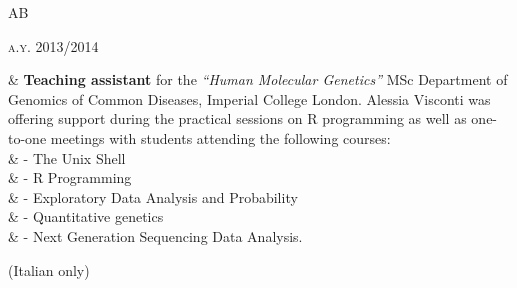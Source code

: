 \documentclass[a4paper,10pt]{article}
\newenvironment{doubletablelist}
{
	\vspace{-0.2cm}
	\begin{longtable}[!h]{AB}}{\end{longtable}
}
\newcommand{\dtlist}[2]{
\hspace{-3cm}
\noindent
	\begin{minipage}{0.22\textwidth}
	\begin{flushright}
	\textsc{#1}
	\end{flushright}
	\end{minipage}
	& #2\\[0.2cm]
}
\begin{document}
\begin{doubletablelist}
	\dtlist{a.y. 2013/2014}{\textbf{Teaching assistant} for the \emph{``Human Molecular Genetics''} MSc Department of Genomics of Common Diseases, Imperial College London. Alessia Visconti was offering support during the practical sessions on R programming as well as one-to-one meetings with students attending the following courses:\\
							& \hskip1cm - The Unix Shell\\
							& \hskip1cm - R Programming\\
							& \hskip1cm - Exploratory Data Analysis and Probability\\
							& \hskip1cm - Quantitative genetics\\
							& \hskip1cm - Next Generation Sequencing Data Analysis.}				
\end{doubletablelist}							


{\footnotesize \noindent (Italian only)}
\end{document}
